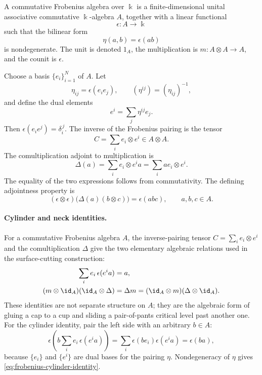 \begin{definition}
\label{def:commutative-frobenius-algebra}
A commutative Frobenius algebra over \(\Bbbk\) is a finite-dimensional
unital associative commutative \(\Bbbk\)-algebra \(A\), together with a
linear functional
\[
  \epsilon:A\to\Bbbk
\]
such that the bilinear form
\begin{equation}
  \eta(a,b)=\epsilon(ab)
  \label{eq:frobenius-pairing}
\end{equation}
is nondegenerate.  The unit is denoted \(1_A\), the multiplication is
\(m:A\otimes A\to A\), and the counit is \(\epsilon\).
\end{definition}

Choose a basis \(\{e_i\}_{i=1}^{N}\) of \(A\).  Let
\[
  \eta_{ij}=\epsilon(e_i e_j),
  \qquad
  (\eta^{ij})=(\eta_{ij})^{-1},
\]
and define the dual elements
\[
  e^i=\sum_j \eta^{ij}e_j .
\]
Then \(\epsilon(e_i e^j)=\delta_i^{\,j}\).  The inverse of the Frobenius
pairing is the tensor
\[
  C=\sum_i e_i\otimes e^i\in A\otimes A.
\]
The comultiplication adjoint to multiplication is
\begin{equation}
  \Delta(a)
  =
  \sum_i e_i\otimes e^i a
  =
  \sum_i ae_i\otimes e^i .
  \label{eq:frobenius-comultiplication}
\end{equation}
The equality of the two expressions follows from commutativity.  The defining
adjointness property is
\begin{equation}
  (\epsilon\otimes\epsilon)\bigl(\Delta(a)(b\otimes c)\bigr)
  =
  \epsilon(abc),
  \qquad a,b,c\in A.
  \label{eq:delta-adjoint-to-m}
\end{equation}

\paragraph{Cylinder and neck identities.}
For a commutative Frobenius algebra \(A\), the inverse-pairing tensor
\(C=\sum_i e_i\otimes e^i\) and the comultiplication \(\Delta\) give the two
elementary algebraic relations used in the surface-cutting construction:
\begin{align}
  \sum_i e_i\,\epsilon(e^i a)&=a,
  \label{eq:frobenius-cylinder-identity}\\
  (m\otimes\id_A)(\id_A\otimes\Delta)
  &=
  \Delta m
  =
  (\id_A\otimes m)(\Delta\otimes\id_A).
  \label{eq:frobenius-neck-identity}
\end{align}
These identities are not separate structure on \(A\); they are the algebraic
form of gluing a cap to a cup and sliding a pair-of-pants critical level past
another one.  For the cylinder identity, pair the left side with an arbitrary
\(b\in A\):
\[
  \epsilon\!\left(b\sum_i e_i\,\epsilon(e^i a)\right)
  =
  \sum_i \epsilon(be_i)\epsilon(e^i a)
  =
  \epsilon(ba),
\]
because \(\{e_i\}\) and \(\{e^i\}\) are dual bases for the pairing
\(\eta\).  Nondegeneracy of \(\eta\) gives
\eqref{eq:frobenius-cylinder-identity}.

